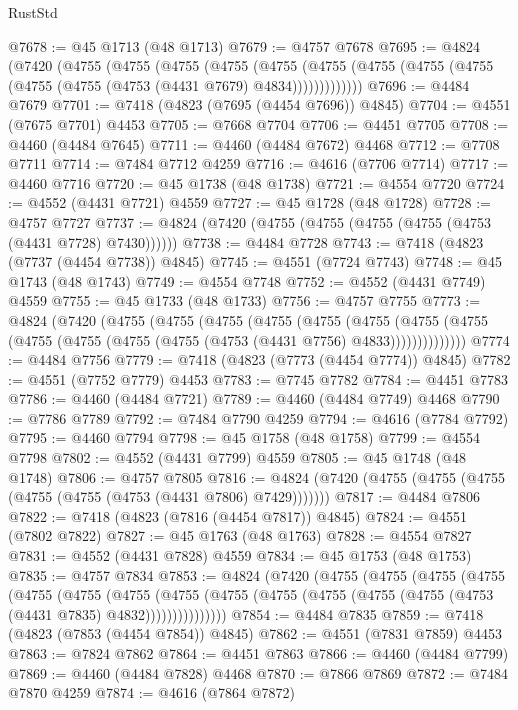 \begin{lexlean}{RustStd}
\begin{coremodule}
@7678 := @45 @1713 (@48 @1713)
@7679 := @4757 @7678
@7695 := @4824
    (@7420
      (@4755
        (@4755
          (@4755
            (@4755
              (@4755
                (@4755 (@4755 (@4755 (@4755 (@4755 (@4755 (@4753 (@4431 @7679) @4834)))))))))))))
@7696 := @4484 @7679
@7701 := @7418 (@4823 (@7695 (@4454 @7696)) @4845)
@7704 := @4551 (@7675 @7701) @4453
@7705 := @7668 @7704
@7706 := @4451 @7705
@7708 := @4460 (@4484 @7645)
@7711 := @4460 (@4484 @7672) @4468
@7712 := @7708 @7711
@7714 := @7484 @7712 @4259
@7716 := @4616 (@7706 @7714)
@7717 := @4460 @7716
@7720 := @45 @1738 (@48 @1738)
@7721 := @4554 @7720
@7724 := @4552 (@4431 @7721) @4559
@7727 := @45 @1728 (@48 @1728)
@7728 := @4757 @7727
@7737 := @4824 (@7420 (@4755 (@4755 (@4755 (@4755 (@4753 (@4431 @7728) @7430))))))
@7738 := @4484 @7728
@7743 := @7418 (@4823 (@7737 (@4454 @7738)) @4845)
@7745 := @4551 (@7724 @7743)
@7748 := @45 @1743 (@48 @1743)
@7749 := @4554 @7748
@7752 := @4552 (@4431 @7749) @4559
@7755 := @45 @1733 (@48 @1733)
@7756 := @4757 @7755
@7773 := @4824
    (@7420
      (@4755
        (@4755
          (@4755
            (@4755
              (@4755
                (@4755
                  (@4755 (@4755 (@4755 (@4755 (@4755 (@4755 (@4753 (@4431 @7756) @4833))))))))))))))
@7774 := @4484 @7756
@7779 := @7418 (@4823 (@7773 (@4454 @7774)) @4845)
@7782 := @4551 (@7752 @7779) @4453
@7783 := @7745 @7782
@7784 := @4451 @7783
@7786 := @4460 (@4484 @7721)
@7789 := @4460 (@4484 @7749) @4468
@7790 := @7786 @7789
@7792 := @7484 @7790 @4259
@7794 := @4616 (@7784 @7792)
@7795 := @4460 @7794
@7798 := @45 @1758 (@48 @1758)
@7799 := @4554 @7798
@7802 := @4552 (@4431 @7799) @4559
@7805 := @45 @1748 (@48 @1748)
@7806 := @4757 @7805
@7816 := @4824 (@7420 (@4755 (@4755 (@4755 (@4755 (@4755 (@4753 (@4431 @7806) @7429)))))))
@7817 := @4484 @7806
@7822 := @7418 (@4823 (@7816 (@4454 @7817)) @4845)
@7824 := @4551 (@7802 @7822)
@7827 := @45 @1763 (@48 @1763)
@7828 := @4554 @7827
@7831 := @4552 (@4431 @7828) @4559
@7834 := @45 @1753 (@48 @1753)
@7835 := @4757 @7834
@7853 := @4824
    (@7420
      (@4755
        (@4755
          (@4755
            (@4755
              (@4755
                (@4755
                  (@4755
                    (@4755
                      (@4755 (@4755 (@4755 (@4755 (@4755 (@4753 (@4431 @7835) @4832)))))))))))))))
@7854 := @4484 @7835
@7859 := @7418 (@4823 (@7853 (@4454 @7854)) @4845)
@7862 := @4551 (@7831 @7859) @4453
@7863 := @7824 @7862
@7864 := @4451 @7863
@7866 := @4460 (@4484 @7799)
@7869 := @4460 (@4484 @7828) @4468
@7870 := @7866 @7869
@7872 := @7484 @7870 @4259
@7874 := @4616 (@7864 @7872)

\end{coremodule}
\end{lexlean}
